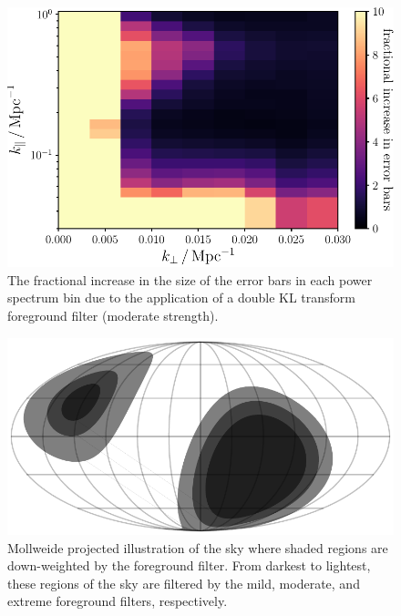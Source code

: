 \begin{bibunit}
\begin{figure}[t]
    \centering
    \includegraphics[width=\columnwidth]{figures/chapter4/cylindrical-power-spectrum-error-bars}
    \caption{
        The fractional increase in the size of the error bars in each power spectrum bin due to the
        application of a double KL transform foreground filter (moderate strength).
    }
    \label{fig:error-bars-increase}
\end{figure}

\begin{figure}[t]
    \centering
    \includegraphics[width=\columnwidth]{figures/chapter4/foreground-filtering-schematic}
    \caption{
        Mollweide projected illustration of the sky where shaded regions are down-weighted by the
        foreground filter. From darkest to lightest, these regions of the sky are filtered by the
        mild, moderate, and extreme foreground filters, respectively.
    }
    \label{fig:foreground-filtering-schematic}
\end{figure}


\end{bibunit}
